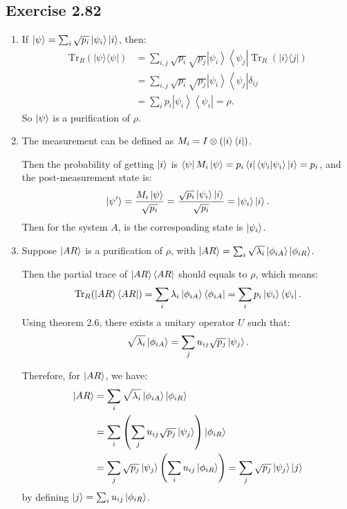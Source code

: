 \subsection*{Exercise 2.82}
\begin{enumerate}[(1)]
    \item If $\ket{\psi}=\sum_i\sqrt{p_i}\ket{\psi_i}\ket{i}$, then:
    \begin{align} \text{Tr}_{R}(|\psi\rangle\langle\psi|) &=\sum_{i, j} \sqrt{p_{i}} \sqrt{p_{j}}\left|\psi_{i}\right\rangle\left\langle\psi_{j}\right| \operatorname{Tr}_{R}(|i\rangle\langle j|) \\ &=\sum_{i, j} \sqrt{p_{i}} \sqrt{p_{j}}\left|\psi_{i}\right\rangle\left\langle\psi_{j}\right| \delta_{i j} \\ &=\sum_{i} p_{i}\left|\psi_{i}\right\rangle\left\langle\psi_{i}\right|=\rho.
    \end{align}
    So $\ket{\psi}$ is a purification of $\rho$.
    
    \item The measurement can be defined as $M_i=I\otimes(\ket{i}\bra{i})$.
    
    Then the probability of getting $\ket{i}$ is $\bra{\psi}M_i\ket{\psi}=p_i\bra{i}\bra{\psi_i}\ket{\psi_i}\ket{i}=p_i$, and the post-measurement state is:
    \begin{align}
    \ket{\psi'}=\frac{M_i\ket{\psi}}{\sqrt{p_i}}=\frac{\sqrt{p_i}\ket{\psi_i}\ket{i}}{\sqrt{p_i}}=\ket{\psi_i}\ket{i}.
    \end{align}
    Then for the system $A$, is the corresponding state is $\ket{\psi_i}$.

\item Suppose $\ket{AR}$ is a purification of $\rho$, with $\ket{AR}=\sum_i \sqrt{\lambda_i}\ket{\phi_{iA}}\ket{\phi_{iR}}$.

Then the partial trace of $\ket{AR}\bra{AR}$ should equals to $\rho$, which means:
    \begin{align}
    \text{Tr}_R(\ket{AR}\bra{AR})=\sum_i\lambda_i\ket{\phi_{iA}}\bra{\phi_{iA}}=\sum_{i}p_i\ket{\psi_i}\bra{\psi_i}.
    \end{align}
    Using theorem 2.6, there exists a unitary operator $U$ such that:
    \begin{align}
\sqrt{\lambda_i}\ket{\phi_{iA}}=\sum_j u_{ij}\sqrt{p_j} \ket{\psi_j}.
    \end{align}
    
    Therefore, for $\ket{AR}$, we have:
    \begin{align}
        \ket{AR} &= \sum_i \sqrt{\lambda_i}\ket{\phi_{iA}}\ket{\phi_{iR}}\\
        &=\sum_i\left(\sum_j u_{ij}\sqrt{p_j} \ket{\psi_j}\right)\ket{\phi_{iR}}\\
        &=\sum_{j}\sqrt{p_j}\ket{\psi_j}\left(\sum_i u_{ij}\ket{\phi_{iR}}\right)
        =\sum_{j}\sqrt{p_j}\ket{\psi_j}\ket{j}
    \end{align}
    by defining $\ket{j}=\sum_i u_{ij}\ket{\phi_{iR}}$.
    

\end{enumerate}
